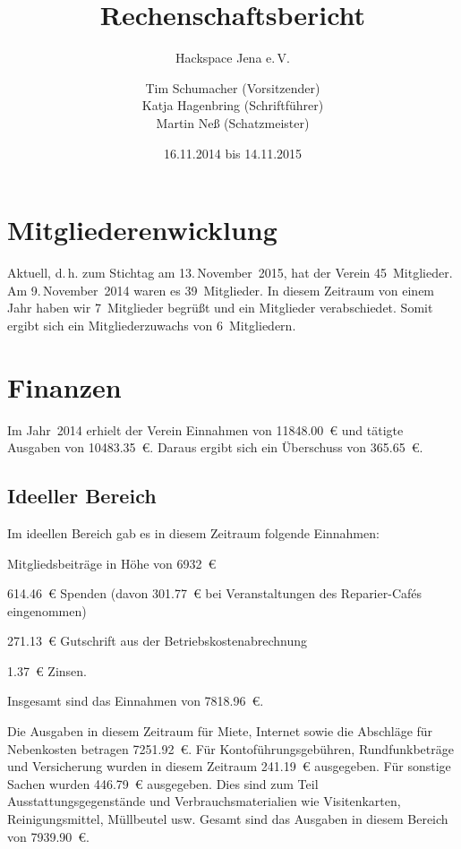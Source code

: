 \documentclass[ngerman]{scrartcl}
\title{Rechenschaftsbericht}
\subtitle{Hackspace Jena e.\,V.}
\author{%
	Tim Schumacher (Vorsitzender)\\
	Katja Hagenbring (Schriftführer)\\
	Martin Neß (Schatzmeister)
}
\date{16.11.2014 bis 14.11.2015}
\begin{document}
\maketitle{}

\tableofcontents{}

\newpage{}

\section{Mitgliederenwicklung}

Aktuell, d.\,h. zum Stichtag am 13.\,November~2015, hat der Verein 45~Mitglieder. Am 9.\,November~2014 waren es 39~Mitglieder.
In diesem Zeitraum von einem Jahr haben wir 7~Mitglieder begrüßt und ein Mitglieder verabschiedet.
Somit ergibt sich ein Mitgliederzuwachs von 6~Mitgliedern.

\section{Finanzen}

Im Jahr~2014 erhielt der Verein Einnahmen von \num{11848,00}~\euro{} und tätigte Ausgaben von \num{10483,35}~\euro{}.
Daraus ergibt sich ein Überschuss von \num{365,65}~\euro{}.

\subsection{Ideeller Bereich}
\label{sec:ideeller_bereich}

Im ideellen Bereich gab es in diesem Zeitraum folgende Einnahmen:
\begin{compactitem}
\item Mitgliedsbeiträge in Höhe von \num{6932}~\euro{}
\item \num{614,46}~\euro{} Spenden (davon \num{301,77}~\euro{} bei Veranstaltungen des Reparier-Cafés eingenommen)
\item \num{271,13}~\euro{} Gutschrift aus der Betriebskostenabrechnung
\item \num{1,37}~\euro{} Zinsen.
\end{compactitem}
Insgesamt sind das Einnahmen von \num{7818,96}~\euro{}.

Die Ausgaben in diesem Zeitraum für Miete, Internet sowie die Abschläge für Nebenkosten betragen \num{7251,92}~\euro{}.
Für Kontoführungsgebühren, Rundfunkbeträge und Versicherung wurden in diesem Zeitraum \num{241.19}~\euro{} ausgegeben.
Für sonstige Sachen wurden \num{446,79}~\euro{} ausgegeben. Dies sind zum Teil Ausstattungsgegenstände und Verbrauchsmaterialien wie Visitenkarten, Reinigungsmittel, Müllbeutel usw.
Gesamt sind das Ausgaben in diesem Bereich von \num{7939,90}~\euro{}.
\end{document}
